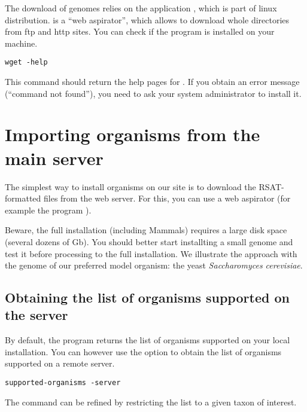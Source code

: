 The download of genomes relies on the application ,
which is part of linux distribution.  is a ``web
aspirator'', which allows to download whole directories from ftp and
http sites. You can check if the program is installed on your machine.

\begin{footnotesize}
\begin{verbatim}
wget -help
\end{verbatim}
\end{footnotesize}


This command should return the help pages for .  If you
obtain an error message (``command not found''), you need to ask your
system administrator to install it.

\section{Importing organisms from the \RSAT main server}

The simplest way to install organisms on our \RSAT site is to download
the RSAT-formatted files from the web server. For this, you can use a
web aspirator (for example the program ). 

Beware, the full installation (including Mammals) requires a large
disk space (several dozens of Gb). You should better start installting
a small genome and test it before processing to the full
installation. We illustrate the approach with the genome of our
preferred model organism: the yeast \textit{Saccharomyces cerevisiae}.

\subsection{Obtaining the list of organisms supported on the \RSAT server}

By default, the program  returns the list
of organisms supported on your local \RSAT installation. You can
however use the option  to obtain the list of
organisms supported on a remote server.


\begin{footnotesize}
\begin{verbatim}
supported-organisms -server
\end{verbatim}
\end{footnotesize}

The command can be refined by restricting the list to a given taxon of
interest.


